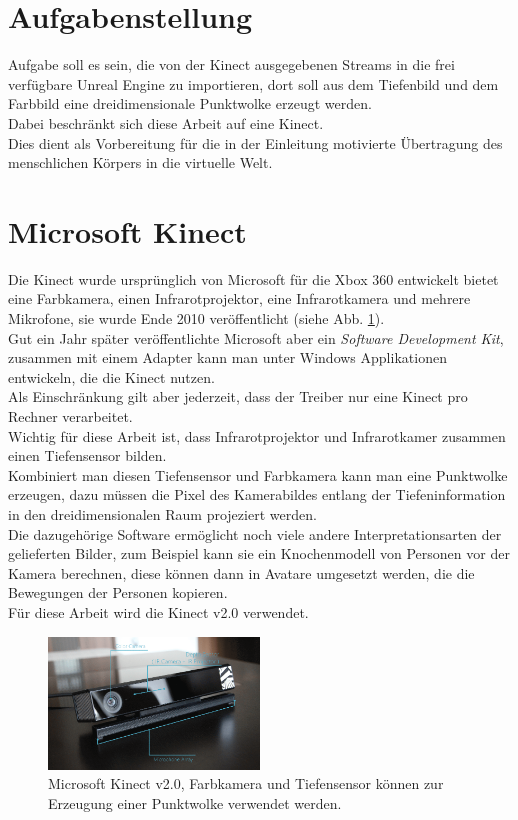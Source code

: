 \documentclass[a4paper]{IEEEtran}
\begin{document}
\section{Aufgabenstellung}
	Aufgabe soll es sein, die von der Kinect ausgegebenen Streams in die frei verfügbare Unreal Engine zu importieren, dort soll aus dem Tiefenbild und dem Farbbild eine dreidimensionale Punktwolke erzeugt werden. \\
	Dabei beschränkt sich diese Arbeit auf eine Kinect. \\
	Dies dient als Vorbereitung für die in der Einleitung motivierte Übertragung des menschlichen Körpers in die virtuelle Welt. \\


\section{Microsoft Kinect}
	Die Kinect wurde ursprünglich von Microsoft für die Xbox 360 entwickelt bietet eine Farbkamera, einen Infrarotprojektor, eine Infrarotkamera und mehrere Mikrofone, sie wurde Ende 2010 veröffentlicht (siehe Abb. \ref{Kinectv2}). \\
	Gut ein Jahr später veröffentlichte Microsoft aber ein \textit{Software Development Kit}, zusammen mit einem Adapter kann man unter Windows Applikationen entwickeln, die die Kinect nutzen.\\
	Als Einschränkung gilt aber jederzeit, dass der Treiber nur eine Kinect pro Rechner verarbeitet.\\
	Wichtig für diese Arbeit ist, dass Infrarotprojektor und Infrarotkamer zusammen einen Tiefensensor bilden. \\
	Kombiniert man diesen Tiefensensor und Farbkamera kann man eine Punktwolke erzeugen, dazu müssen die Pixel des Kamerabildes entlang der Tiefeninformation in den dreidimensionalen Raum projeziert werden. \\
	Die dazugehörige Software ermöglicht noch viele andere Interpretationsarten der gelieferten Bilder, zum Beispiel kann sie ein Knochenmodell von Personen vor der Kamera berechnen, diese können dann in Avatare umgesetzt werden, die die Bewegungen der Personen kopieren.\\
	Für diese Arbeit wird die Kinect v2.0 verwendet. \\[0.5cm]
	
	\begin{figure}[!h]
    	\centering
		\includegraphics[width=0.5\textwidth]{img/Kinectv2}
	    \caption{Microsoft Kinect v2.0, Farbkamera und Tiefensensor können zur Erzeugung einer Punktwolke verwendet werden.}
    	\label{Kinectv2}
	\end{figure}
	
\end{document}
